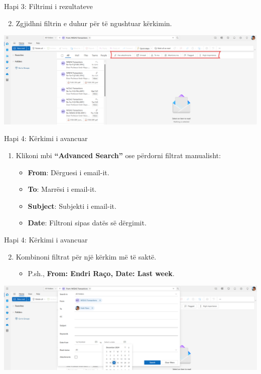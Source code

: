 \documentclass[
  ignorenonframetext,
]{beamer}
\providecommand{\tightlist}{%
  \setlength{\itemsep}{0pt}\setlength{\parskip}{0pt}}
\begin{document}
\begin{frame}{Hapi 3: Filtrimi i rezultateve}
\label{hapi-3-filtrimi-i-rezultateve-1}
\begin{enumerate}
\setcounter{enumi}{1}
\tightlist
\item
  Zgjidhni filtrin e duhur për të ngushtuar kërkimin.
\end{enumerate}

\includegraphics{./images/outlook19.png}
\end{frame}

\begin{frame}{Hapi 4: Kërkimi i avancuar}
\label{hapi-4-kuxebrkimi-i-avancuar}
\begin{enumerate}
\item
  Klikoni mbi \textbf{``Advanced Search''} ose përdorni filtrat
  manualisht:

  \begin{itemize}
  \item
    \textbf{From}: Dërguesi i email-it.
  \item
    \textbf{To}: Marrësi i email-it.
  \item
    \textbf{Subject}: Subjekti i email-it.
  \item
    \textbf{Date}: Filtroni sipas datës së dërgimit.
  \end{itemize}
\end{enumerate}
\end{frame}

\begin{frame}{Hapi 4: Kërkimi i avancuar}
\label{hapi-4-kuxebrkimi-i-avancuar-1}
\begin{enumerate}
\setcounter{enumi}{1}
\item
  Kombinoni filtrat për një kërkim më të saktë.

  \begin{itemize}
  \tightlist
  \item
    P.sh., \textbf{From: Endri Raço, Date: Last week}.
  \end{itemize}
\end{enumerate}

\includegraphics{./images/outlook20.png}
\end{frame}
\end{document}

